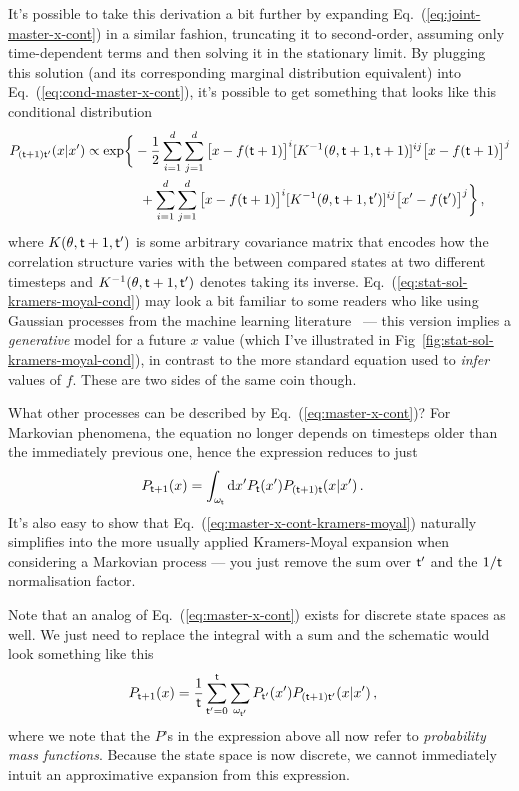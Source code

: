 \documentclass{book}
\begin{document}
It's possible to take this derivation a bit further by expanding Eq.~(\ref{eq:joint-master-x-cont}) in a similar fashion, truncating it to second-order, assuming only time-dependent terms and then solving it in the stationary limit. By plugging this solution (and its corresponding marginal distribution equivalent) into Eq.~(\ref{eq:cond-master-x-cont}), it's possible to get something that looks like this conditional distribution
\begin{align}
P_{({\sf t}+1){\sf t}'}(x\vert x') &\propto {\rm exp}\bigg\{ -\frac{1}{2}\sum^d_{i=1}\sum^d_{j=1}\big[ x-f({\sf t}+1)\big]^i [K^{-1}(\theta , {\sf t}+1,{\sf t}+1)]^{ij}\big[ x-f({\sf t}+1)\big]^j \nonumber \\
& \qquad \qquad + \sum^d_{i=1}\sum^d_{j=1}\big[ x-f({\sf t}+1)\big]^i [K^{-1}(\theta , {\sf t}+1,{\sf t}')]^{ij}\big[ x'-f({\sf t}')\big]^j  \bigg\} \label{eq:stat-sol-kramers-moyal-cond}\,,
\end{align}
where $K(\theta , {\sf t}+1,{\sf t}')$ is some arbitrary covariance matrix that encodes how the correlation structure varies with the between compared states at two different timesteps and $K^{-1}(\theta , {\sf t}+1,{\sf t}')$ denotes taking its inverse. Eq.~(\ref{eq:stat-sol-kramers-moyal-cond}) may look a bit familiar to some readers who like using Gaussian processes from the machine learning literature~\cite{murphy2012machine} --- this version implies a \emph{generative} model for a future $x$ value (which I've illustrated in Fig~\ref{fig:stat-sol-kramers-moyal-cond}), in contrast to the more standard equation used to \emph{infer} values of $f$. These are two sides of the same coin though.

What other processes can be described by Eq.~(\ref{eq:master-x-cont})? For Markovian phenomena, the equation no longer depends on timesteps older than the immediately previous one, hence the expression reduces to just
\begin{align}
P_{{\sf t}+1}(x) &= \int_{\omega_{\sf t}}{\rm d}x' P_{\sf t}(x') P_{({\sf t}+1){\sf t}}(x\vert x') \label{eq:master-x-cont-markov} \,.
\end{align}
It's also easy to show that Eq.~(\ref{eq:master-x-cont-kramers-moyal}) naturally simplifies into the more usually applied Kramers-Moyal expansion when considering a Markovian process --- you just remove the sum over ${\sf t}'$ and the $1/{\sf t}$ normalisation factor. 

Note that an analog of Eq.~(\ref{eq:master-x-cont}) exists for discrete state spaces as well. We just need to replace the integral with a sum and the schematic would look something like this
\begin{align}
P_{{\sf t}+1}(x) &= \frac{1}{{\sf t}}\sum_{{\sf t}'=0}^{\sf t}\sum_{\omega_{{\sf t}'}} P_{{\sf t}'}(x') P_{({\sf t}+1){\sf t}'}(x \vert x') \label{eq:master-x-disc} \,,
\end{align}
where we note that the $P$'s in the expression above all now refer to \emph{probability mass functions}. Because the state space is now discrete, we cannot immediately intuit an approximative expansion from this expression. 
\end{document}
